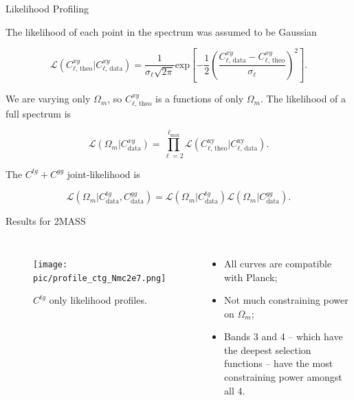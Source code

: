 \documentclass[serif, aspectratio=169]{beamer}
\begin{document}
\begin{frame}{Likelihood Profiling}
    
    The likelihood of each point in the spectrum was assumed to be Gaussian

    \begin{equation}\label{likelihood_cl}
    	\mathcal{L}(C_{\ell\text{, theo}}^{xy}|C_{\ell\text{, data}}^{xy})=\frac{1}{\sigma_\ell \sqrt{2\pi}}\text{exp}\left[-\frac{1}{2}\left(\frac{C_{\ell\text{, data}}^{xy}-C_{\ell\text{, theo}}^{xy}}{\sigma_\ell}\right)^2\right].
    \end{equation}

    We are varying only $\Omega_m$, so $C_{\ell\text{, theo}}^{xy}$ is a functions of only $\Omega_m$. The likelihood of a full spectrum is

    \begin{equation}\label{likelihood_cxy}
    	\mathcal{L}(\Omega_m|C^{xy}_\text{data})=\prod_{\ell=2}^{\ell_\text{max}} \mathcal{L}(C_{\ell\text{, theo}}^\text{xy}|C_{\ell\text{, data}}^\text{xy}).
    \end{equation}

    The $C^{tg}+C^{gg}$ joint-likelihood is

    \begin{equation}
        \mathcal{L}(\Omega_m|C^{tg}_\text{data},C^{gg}_\text{data})=\mathcal{L}(\Omega_m|C^{tg}_\text{data})\mathcal{L}(\Omega_m|C^{gg}_\text{data}).
    \end{equation}
\end{frame}

\begin{frame}{Results for 2MASS}
    \begin{columns}
        \begin{figure}
            \centering
            \texttt{[image: pic/profile\_ctg\_Nmc2e7.png]}
            \caption{$C^{tg}$ only likelihood profiles.}
            \label{fig:prof_ctg}
    \end{figure}
        \begin{itemize}
            \item All curves are compatible with Planck;
            \item Not much constraining power on $\Omega_m$;
            \item Bands 3 and 4 -- which have the deepest selection functions -- have the most constraining power amongst all 4.
        \end{itemize}
    \end{columns}
\end{frame}
\end{document}
